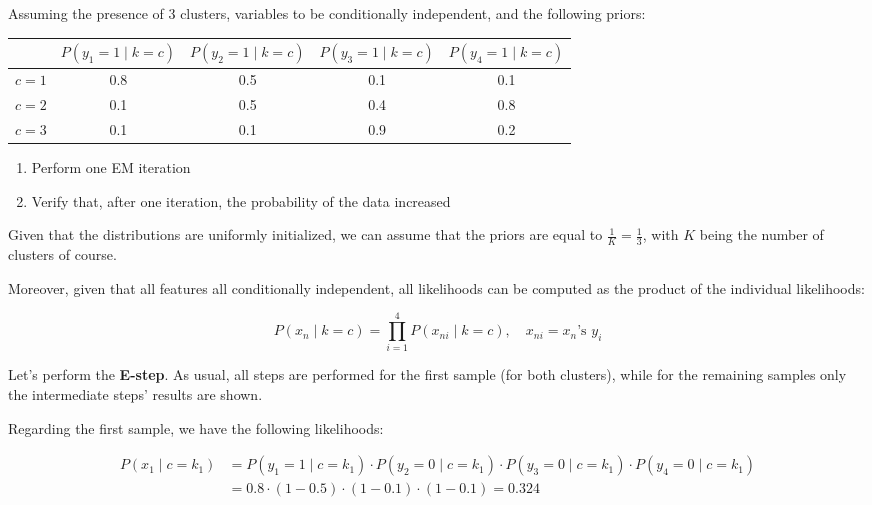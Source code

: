 \documentclass[12pt]{article}
\begin{document}
\begin{enumerate}[leftmargin=\labelsep]
\begin{tcolorbox}[enhanced jigsaw,halign=center,colback=bg,boxrule=0pt,arc=1pt]
    Assuming the presence of 3 clusters, variables to be conditionally independent, and
    the following priors:

    \begin{table}[H]
      \centering
      \begin{tabular}{c|c|c|c|c}
                & $P(y_1 = 1 \mid k = c)$ & $P(y_2 = 1 \mid k = c)$ & $P(y_3 = 1 \mid k = c)$ & $P(y_4 = 1 \mid k = c)$ \\ \hline
        $c = 1$ & 0.8                     & 0.5                     & 0.1                     & 0.1                     \\
        $c = 2$ & 0.1                     & 0.5                     & 0.4                     & 0.8                     \\
        $c = 3$ & 0.1                     & 0.1                     & 0.9                     & 0.2
      \end{tabular}
    \end{table}

    \begin{enumerate}
      \item Perform one EM iteration
      \item Verify that, after one iteration, the probability of the data increased
    \end{enumerate}

  \end{tcolorbox}

  Given that the distributions are uniformly initialized, we can assume that the
  priors are equal to $\frac{1}{K} = \frac{1}{3}$, with $K$ being the
  number of clusters of course.

  Moreover, given that all features all conditionally independent, all likelihoods
  can be computed as the product of the individual likelihoods:

  \begin{equation*}
    P(x_n \mid k = c) = \prod_{i = 1}^4 P(x_{ni} \mid k = c), \quad x_{ni} = x_n \text{'s } y_i
  \end{equation*}

  Let's perform the \textbf{E-step}. As usual, all steps are performed for the first sample
  (for both clusters), while for the remaining samples only the intermediate steps' results
  are shown.

  Regarding the first sample, we have the following likelihoods:

  \begin{equation*}
    \begin{aligned}
      P(x_1 \mid c = k_1) & = P(y_1 = 1 \mid c = k_1) \cdot P(y_2 = 0 \mid c = k_1) \cdot P(y_3 = 0 \mid c = k_1) \cdot P(y_4 = 0 \mid c = k_1) \\
                          & = 0.8 \cdot (1 - 0.5) \cdot (1 - 0.1) \cdot (1 - 0.1) = 0.324
    \end{aligned}
  \end{equation*}


\end{enumerate}
\end{document}
